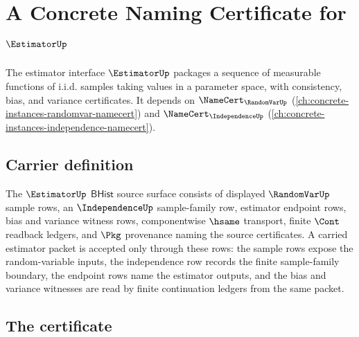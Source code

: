 \chapter{A Concrete Naming Certificate for $\EstimatorUp$}
\label{ch:concrete-instances-estimator-namecert}

The estimator interface $\EstimatorUp$ packages a sequence of measurable functions of i.i.d. samples taking values in a parameter space, with consistency, bias, and variance certificates. It depends on $\NameCert_{\RandomVarUp}$ (\autoref{ch:concrete-instances-randomvar-namecert}) and $\NameCert_{\IndependenceUp}$ (\autoref{ch:concrete-instances-independence-namecert}).

\section{Carrier definition}
\label{sec:estimator-carrier}

\begin{definition}
\label{def:estimator-bhist-source-surface}
The $\EstimatorUp$ $\mathsf{BHist}$ source surface consists of displayed
$\RandomVarUp$ sample rows, an $\IndependenceUp$ sample-family row, estimator
endpoint rows, bias and variance witness rows, componentwise $\hsame$
transport, finite $\Cont$ readback ledgers, and $\Pkg$ provenance naming the
source certificates. A carried estimator packet is accepted only through these
rows: the sample rows expose the random-variable inputs, the independence row
records the finite sample-family boundary, the endpoint rows name the
estimator outputs, and the bias and variance witnesses are read by finite
continuation ledgers from the same packet.
\end{definition}

\section{The certificate}
\label{sec:estimator-certificate}

